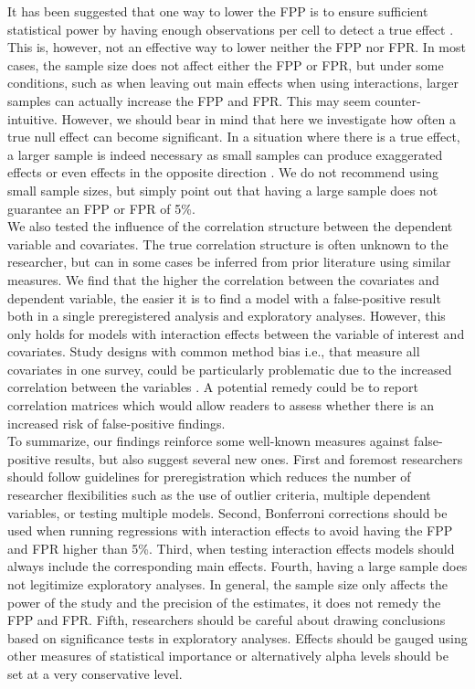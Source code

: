 It has been suggested that one way to lower the FPP is to ensure sufficient statistical power by having enough observations per cell to detect a true effect \citep{Simmons2011, simmons2018}. This is, however, not an effective way to lower neither the FPP nor FPR. In most cases, the sample size does not affect either the FPP or FPR, but under some conditions, such as when leaving out main effects when using interactions, larger samples can actually increase the FPP and FPR. This may seem counter-intuitive. However, we should bear in mind that here we investigate how often a true null effect can become significant. In a situation where there is a true effect, a larger sample is indeed necessary as small samples can produce exaggerated effects or even effects in the opposite direction \citep{gelman2014beyond}. We do not recommend using small sample sizes, but simply point out that having a large sample does not guarantee an FPP or FPR of 5\%. \\

We also tested the influence of the correlation structure between the dependent variable and covariates. The true correlation structure is often unknown to the researcher, but can in some cases be inferred from prior literature using similar measures. We find that the higher the correlation between the covariates and dependent variable, the easier it is to find a model with a false-positive result both in a single preregistered analysis and exploratory analyses. However, this only holds for models with interaction effects between the variable of interest and covariates. Study designs with common method bias i.e., that measure all covariates in one survey, could be particularly problematic due to the increased correlation between the variables \citep{podsakoff2003}. A potential remedy could be to report correlation matrices which would allow readers to assess whether there is an increased risk of false-positive findings.  \\ 

To summarize, our findings reinforce some well-known measures against false-positive results, but also suggest several new ones. First and foremost researchers should follow guidelines for preregistration \citep{Nosek2015,VANTVEER20162} which reduces the number of researcher flexibilities such as the use of outlier criteria, multiple dependent variables, or testing multiple models. Second, Bonferroni corrections should be used when running regressions with interaction effects to avoid having the FPP and FPR higher than 5\%. Third, when testing interaction effects models should always include the corresponding main effects. Fourth, having a large sample does not legitimize exploratory analyses. In general, the sample size only affects the power of the study and the precision of the estimates, it does not remedy the FPP and FPR. Fifth, researchers should be careful about drawing conclusions based on significance tests in exploratory analyses. Effects should be gauged using other measures of statistical importance or alternatively alpha levels should be set at a very conservative level. \\

